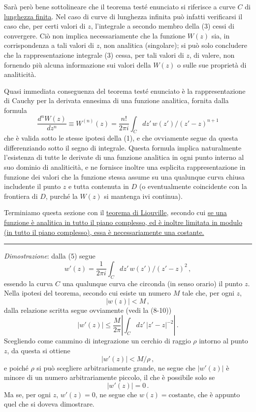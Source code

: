 \documentclass[11pt, a4paper]{book}
\numberwithin{equation}{section}
\begin{document}
Sarà però bene sottolineare che il teorema testé enunciato si riferisce a curve $C$ di \underline{lunghezza finita}. Nel caso di curve di lunghezza infinita può infatti verificarsi il caso che, per certi valori di $z$, l'integrale a secondo membro della (3) cessi di convergere. Ciò non implica necessariamente che la funzione $W(z)$ sia, in corrispondenza a tali valori di $z$, non analitica (singolare); si può solo concludere che la rappresentazione integrale (3) cessa, per tali valori di $z$, di valere, non fornendo più alcuna informazione sui valori della $W(z)$ o sulle sue proprietà di analiticità.

Quasi immediata conseguenza del teorema testé enunciato è la rappresentazione di Cauchy per la derivata ennesima di una funzione analitica, fornita dalla formula
\begin{equation}
\frac{d^n W(z)}{dz^n} \equiv W^{(n)}(z) = \frac{n!}{2\pi i} \int_C dz'\, w(z') / (z'-z)^{n+1} \tag{5}
\end{equation}
che è valida sotto le stesse ipotesi della (1), e che ovviamente segue da questa differenziando sotto il segno di integrale. Questa formula implica naturalmente l'esistenza di tutte le derivate di una funzione analitica in ogni punto interno al suo dominio di analiticità, e ne fornisce inoltre una esplicita rappresentazione in funzione dei valori che la funzione stessa assume su una qualunque curva chiusa includente il punto $z$ e tutta contenuta in $D$ (o eventualmente coincidente con la frontiera di $D$, purché la $W(z)$ si mantenga ivi continua).

Terminiamo questa sezione con il \underline{teorema di Liouville}, secondo cui \underline{se una funzione è analitica in tutto il piano complesso, ed è inoltre limitata in modulo (in tutto il piano complesso), essa è necessariamente una costante.}

\medskip\hrule\medskip

\textit{Dimostrazione}: dalla (5) segue
\[
w'(z) = \frac{1}{2\pi i} \int_C dz'\, w(z') / (z'-z)^2\,,
\]
essendo la curva $C$ una qualunque curva che circonda (in senso orario) il punto $z$. Nella ipotesi del teorema, secondo cui esiste un numero $M$ tale che, per ogni $z$,
\[
|w(z)| < M\,,
\]
dalla relazione scritta segue ovviamente (vedi la (8-10))
\[
|w'(z)| \leq \frac{M}{2\pi} \left| \int_C dz'\, |z'-z|^{-2} \right|\,.
\]
Scegliendo come cammino di integrazione un cerchio di raggio $\rho$ intorno al punto $z$, da questa si ottiene
\[
|w'(z)| < M/\rho\,,
\]
e poiché $\rho$ si può scegliere arbitrariamente grande, ne segue che $|w'(z)|$ è minore di un numero arbitrariamente piccolo, il che è possibile solo se
\[
|w'(z)| = 0\,.
\]
Ma se, per ogni $z$, $w'(z) = 0$, ne segue che $w(z) = \text{costante}$, che è appunto quel che si doveva dimostrare.
\end{document}
